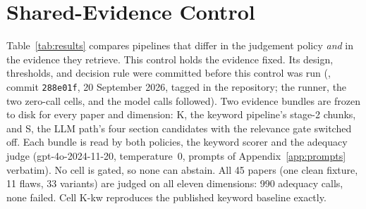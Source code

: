 \section{Shared-Evidence Control}
\label{app:shared}

Table~\ref{tab:results} compares pipelines that differ in the judgement policy
\emph{and} in the evidence they retrieve. This control holds the evidence fixed.
Its design, thresholds, and decision rule were committed before this control
was run (, commit \texttt{288e01f}, 20
September 2026, tagged in the repository; the runner, the two zero-call cells, and the model calls
followed). Two evidence bundles are
frozen to disk for every paper and dimension: K, the keyword
pipeline's stage-2 chunks, and S, the LLM path's four section candidates with
the relevance gate switched off. Each bundle is read by both policies, the
keyword scorer and the adequacy judge (gpt-4o-2024-11-20, temperature~$0$,
prompts of Appendix~\ref{app:prompts} verbatim). No cell is gated, so none can
abstain. All 45 papers (one clean fixture, 11 flaws, 33 variants) are judged on
all eleven dimensions: 990 adequacy calls, none failed. Cell K-kw reproduces the
published keyword baseline exactly.

\begin{table}[t]
  \centering\small
  \caption{Shared-evidence control: evidence bundle (K, keyword chunks; S,
  ungated sections) $\times$ judgement policy (kw, keyword scorer; llm, adequacy
  judge). det / fa / loc as in Table~\ref{tab:matrix}; off = share of the ten
  non-target dimensions rated $\geq$ medium on the injected variants. The
  reference row is the gated pipeline on the gpt-4o alias (detection and false
  alarm from run~1, Table~\ref{tab:ci}; localization is the three-run mean of
  Table~\ref{tab:variants}).}
  \label{tab:shared}
  \setlength{\tabcolsep}{3pt}
\end{table}

